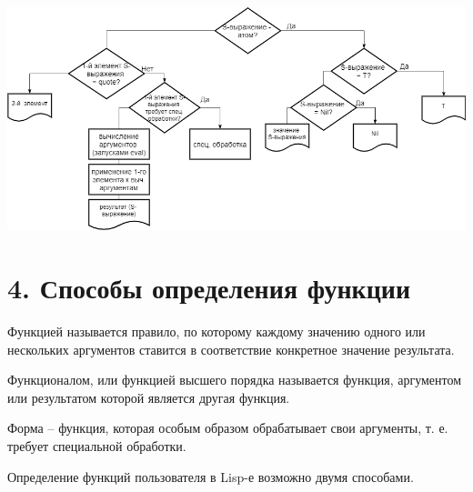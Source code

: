\documentclass[12pt]{report}
\begin{document}
\includegraphics[scale=0.5]{img/eval}

\section*{4. Способы определения функции}

Функцией называется правило, по которому каждому значению одного или нескольких  аргументов ставится в соответствие конкретное значение результата. 


Функционалом, или функцией высшего порядка называется функция, аргументом или  результатом которой является другая функция.

Форма -- функция, которая особым образом обрабатывает свои аргументы, т. е. требует специальной обработки.


Определение функций пользователя в Lisp-е возможно двумя способами.
\end{document}
